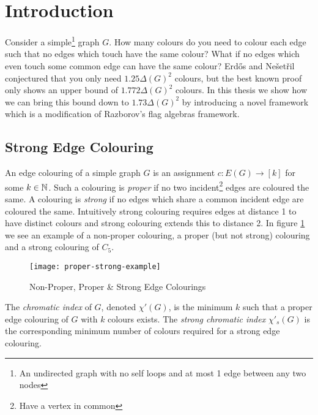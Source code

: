 \chapter*{Introduction}

Consider a simple\footnote{An undirected graph with no self loops and at most 1 edge between any two nodes} graph $G$. How many colours do you need to colour each edge such that no edges which touch
have the same colour? What if no edges which even touch some common edge can have the same colour?
Erd\H{o}s and Nešetřil conjectured that you only need $1.25\Delta(G)^2$ colours, but
the best known proof only shows an upper bound of $1.772\Delta(G)^2$ colours. In this thesis
we show how we can bring this bound down to $1.73\Delta(G)^2$ by introducing a novel framework
which is a modification of Razborov's flag algebras framework.

\section*{Strong Edge Colouring}

An edge colouring of a simple graph $G$ is an assignment $c\colon E(G) \to [k]$
for some $k\in\mathbb{N}$. Such a colouring is \textit{proper} if no two incident\footnote{Have a vertex in common}
edges are coloured the same.
A colouring is \textit{strong} if no edges which share a common incident edge are
coloured the same. Intuitively strong colouring requires edges at distance 1 to have distinct
colours and strong colouring extends this to distance 2.
In figure \ref{fig:proper-strong-example} we see an example of a non-proper colouring,
a proper (but not strong) colouring and a strong colouring of $C_5$.

\begin{figure}[h]
    \centering
    \texttt{[image: proper-strong-example]}
    \caption{Non-Proper, Proper \& Strong Edge Colourings}
    \label{fig:proper-strong-example}
\end{figure}

The \textit{chromatic index} of $G$, denoted $\chi'(G)$, is the minimum $k$ such that a proper edge
colouring of $G$ with $k$ colours exists. The \textit{strong chromatic index} $\chi'_s(G)$
is the corresponding minimum number of colours required for a strong edge colouring.

